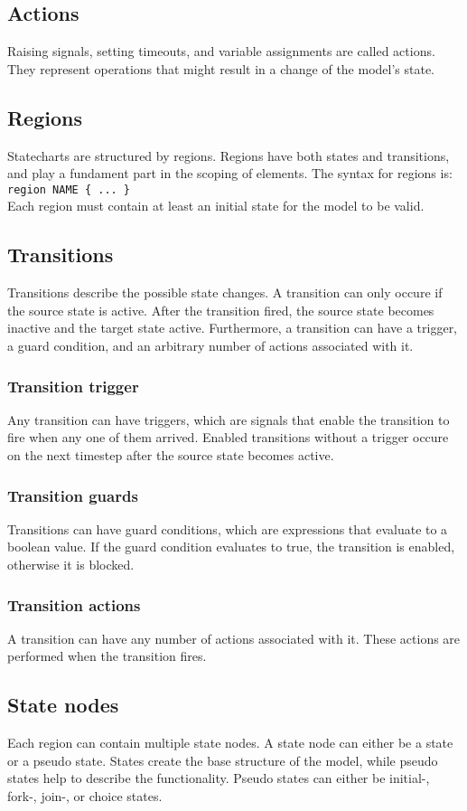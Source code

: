 {  \subsection{Actions}
Raising signals, setting timeouts, and variable assignments are called actions. They represent operations that might result in a change of the model's state.
  \subsection{Regions}
Statecharts are structured by regions. Regions have both states and transitions, and play a fundament part in the scoping of elements. The syntax for regions is: \\\verb!region NAME { ... }!\\ Each region must contain at least an initial state for the model to be valid.
  \subsection{Transitions}
Transitions describe the possible state changes. A transition can only occure if the source state is active. After the transition fired, the source state becomes inactive and the target state active. Furthermore, a transition can have a trigger, a guard condition, and an arbitrary number of actions associated with it.
    \subsubsection{Transition trigger}
Any transition can have triggers, which are signals that enable the transition to fire when any one of them arrived. Enabled transitions without a trigger occure on the next timestep after the source state becomes active.
    \subsubsection{Transition guards}
Transitions can have guard conditions, which are expressions that evaluate to a boolean value. If the guard condition evaluates to true, the transition is enabled, otherwise it is blocked.
    \subsubsection{Transition actions}
A transition can have any number of actions associated with it. These actions are performed when the transition fires.
  \subsection{State nodes}
Each region can contain multiple state nodes. A state node can either be a state or a pseudo state. States create the base structure of the model, while pseudo states help to describe the functionality. Pseudo states can either be initial-, fork-, join-, or choice states.
}
